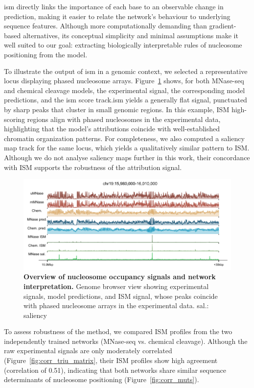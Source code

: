 \documentclass[11pt]{book}
\begin{document}
\gls{ism} directly links the importance of each base to an observable change in prediction, making it easier to relate the network’s behaviour to underlying sequence features. Although more computationally demanding than gradient-based alternatives, its conceptual simplicity and minimal assumptions make it well suited to our goal: extracting biologically interpretable rules of nucleosome positioning from the model.

To illustrate the output of \gls{ism} in a genomic context, we selected a representative locus displaying phased nucleosome arrays. 
Figure~\ref{fig:focus_genomebrowser} shows, for both MNase-seq and chemical cleavage models, the experimental signal, the corresponding model predictions, and the \gls{ism} score track.\gls{ism} yields a generally flat signal, punctuated by sharp peaks that cluster in small genomic regions.
In this example, ISM high-scoring regions align with phased nucleosomes in the experimental data, highlighting that the model’s attributions coincide with well-established chromatin organization patterns.
For completeness, we also computed a saliency map track for the same locus, which yields a qualitatively similar pattern to ISM. Although we do not analyse saliency maps further in this work, their concordance with ISM supports the robustness of the attribution signal.

\begin{figure}[htbp]
    \centering
    \includegraphics[width=\textwidth]{Figures/Results/focus_genome_browser_example.pdf}
    \caption{\textbf{Overview of nucleosome occupancy signals and network interpretation.} Genome browser view showing experimental signals, model predictions, and ISM signal, whose peaks coincide with phased nucleosome arrays in the experimental data. sal.: saliency}
    \label{fig:focus_genomebrowser}
\end{figure}

To assess robustness of the method, we compared ISM profiles from the two independently trained networks (MNase-seq vs. chemical cleavage). Although the raw experimental signals are only moderately correlated (Figure~\ref{fig:corr_triu_matrix}, their ISM profiles show high agreement (correlation of 0.51), indicating that both networks share similar sequence determinants of nucleosome positioning (Figure~\ref{fig:corr_muts}).\\
\end{document}
